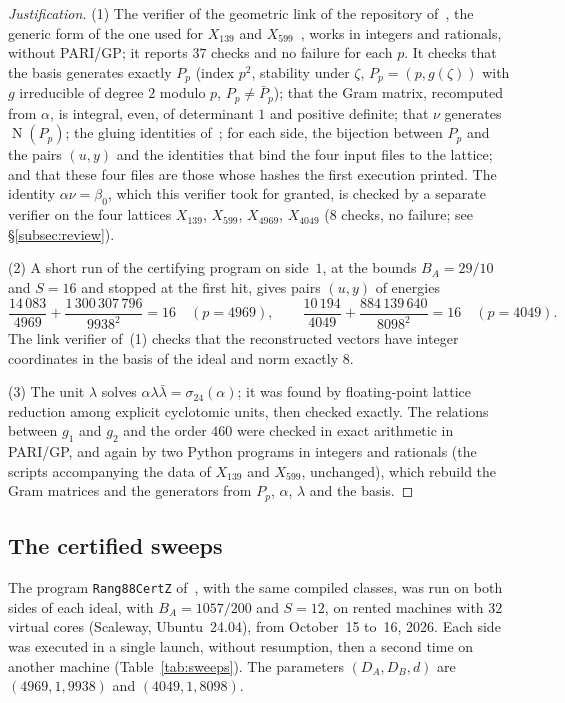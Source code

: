 \documentclass[11pt,a4paper]{amsart}
\theoremstyle{plain}
\theoremstyle{definition}
\DeclareMathOperator{\Nm}{N}
\begin{document}
\begin{proof}[Justification]
(1) The verifier of the geometric link of the repository of~\cite{Gau26}, the generic form of the one used for $X_{139}$ and $X_{599}$~\cite[Prop.~6.3, 6.4]{Gau26}, works in integers and rationals, without PARI/GP; it reports $37$ checks and no failure for each $p$. It checks that the basis generates exactly $P_p$ (index $p^2$, stability under $\zeta$, $P_p=(p,g(\zeta))$ with $g$ irreducible of degree $2$ modulo $p$, $P_p\ne\bar P_p$); that the Gram matrix, recomputed from $\alpha$, is integral, even, of determinant $1$ and positive definite; that $\nu$ generates $\Nm(P_p)$; the gluing identities of~\cite[Prop.~4.1]{Gau26}; for each side, the bijection between $P_p$ and the pairs $(u,y)$ and the identities that bind the four input files to the lattice; and that these four files are those whose hashes the first execution printed. The identity $\alpha\nu=\beta_0$, which this verifier took for granted, is checked by a separate verifier on the four lattices $X_{139}$, $X_{599}$, $X_{4969}$, $X_{4049}$ ($8$ checks, no failure; see \S\ref{subsec:review}).

(2) A short run of the certifying program on side~$1$, at the bounds $B_A=29/10$ and $S=16$ and stopped at the first hit, gives pairs $(u,y)$ of energies
\[
\frac{14\,083}{4969}+\frac{1\,300\,307\,796}{9938^2}=16\quad(p=4969),\qquad \frac{10\,194}{4049}+\frac{884\,139\,640}{8098^2}=16\quad(p=4049).
\]
The link verifier of~(1) checks that the reconstructed vectors have integer coordinates in the basis of the ideal and norm exactly $8$.

(3) The unit $\lambda$ solves $\alpha\lambda\bar\lambda=\sigma_{24}(\alpha)$; it was found by floating-point lattice reduction among explicit cyclotomic units, then checked exactly. The relations between $g_1$ and $g_2$ and the order $460$ were checked in exact arithmetic in PARI/GP, and again by two Python programs in integers and rationals (the scripts accompanying the data of $X_{139}$ and $X_{599}$, unchanged), which rebuild the Gram matrices and the generators from $P_p$, $\alpha$, $\lambda$ and the basis.
\end{proof}

\subsection{The certified sweeps}
The program \texttt{Rang88CertZ} of~\cite[\S5]{Gau26}, with the same compiled classes, was run on both sides of each ideal, with $B_A=1057/200$ and $S=12$, on rented machines with $32$ virtual cores (Scaleway, Ubuntu~24.04), from October~15 to~16, 2026. Each side was executed in a single launch, without resumption, then a second time on another machine (Table~\ref{tab:sweeps}). The parameters $(D_A,D_B,d)$ are $(4969,1,9938)$ and $(4049,1,8098)$.
\end{document}
